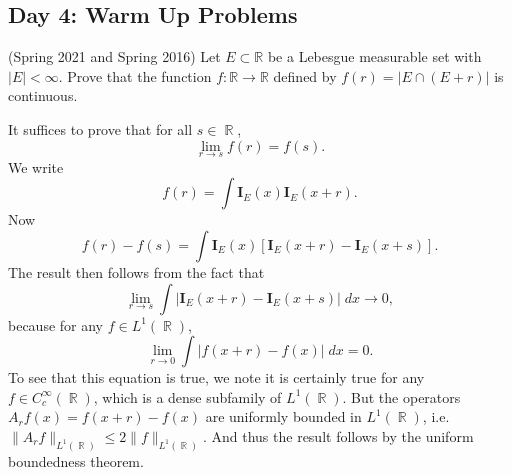 \documentclass[answers]{exam}
\DeclareMathOperator{\RR}{\mathbb{R}}
\theoremstyle{problemstyle}
\newcommand{\1}[1]{\textbf{1}_{\left[#1\right]}} %
\def\R{\mathbb{R}} %
\begin{document}
\begin{questions}    

\newpage
\section*{Day 4: Warm Up Problems}

\question  (Spring 2021 and Spring 2016)
  Let $E\subset \R$ be a Lebesgue measurable set with $|E|<\infty$. Prove that the function $f:\R\to \R$ defined by $f(r)= |E\cap (E+r)|$ is continuous.
\begin{solution}
    It suffices to prove that for all $s \in \RR$,
    \[ \lim_{r \to s} f(r) = f(s). \]
    We write
    \[ f(r) = \int \mathbf{I}_E(x) \mathbf{I}_E(x + r). \]
    Now
    \[ f(r) - f(s) = \int \mathbf{I}_E(x) [\mathbf{I}_E(x + r) - \mathbf{I}_E(x + s)]. \]
    The result then follows from the fact that
    \[ \lim_{r \to s} \int | \mathbf{I}_E(x + r) - \mathbf{I}_E(x + s)|\; dx \to 0, \]
    because for any $f \in L^1(\RR)$,
    \[ \lim_{r \to 0} \int |f(x + r) - f(x)|\; dx = 0. \]
    To see that this equation is true, we note it is certainly true for any $f \in C_c^\infty(\RR)$, which is a dense subfamily of $L^1(\RR)$. But the operators $A_r f(x) = f(x + r) - f(x)$ are uniformly bounded in $L^1(\RR)$, i.e. $\| A_r f \|_{L^1(\RR)} \leq 2 \| f \|_{L^1(\RR)}$. And thus the result follows by the uniform boundedness theorem.

    \begin{comment}
    As $r \to s$, the integrand tends to zero pointwise. And moreover, the integrands are uniformly dominated by $2\mathbf{I}_E$, which is an integrable function. Thus the dominated convergence theorem implies that
    \[ \lim_{r \to s} f(r) - f(s) = 0. \]
    Thus $f$ is a continuous function.


\end{comment}
\end{solution}
\end{questions}
\end{document}
